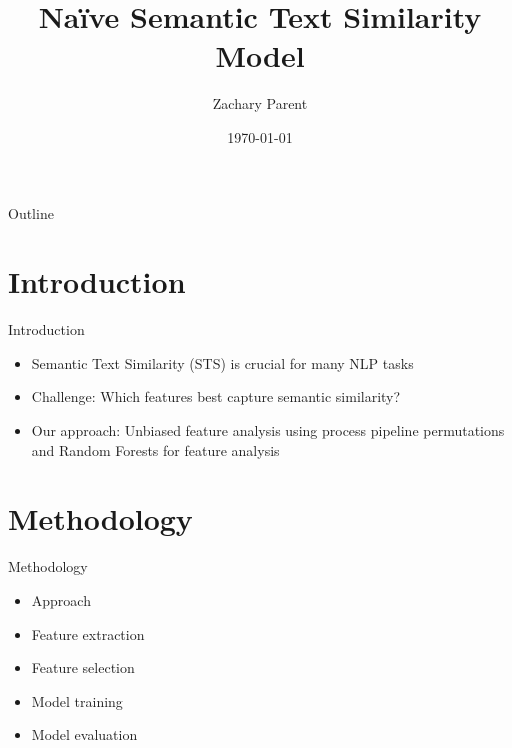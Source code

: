 \documentclass{beamer}
\title{Naïve Semantic Text Similarity Model}
\author{Zachary Parent}
\institute{UPC}
\date{\today}
\begin{document}
\begin{frame}
    \titlepage
\end{frame}

\begin{frame}{Outline}
    \tableofcontents
\end{frame}

\section{Introduction}
\begin{frame}{Introduction}
    \begin{itemize}
        \item Semantic Text Similarity (STS) is crucial for many NLP tasks
        \item Challenge: Which features best capture semantic similarity?
        \item Our approach: Unbiased feature analysis using process pipeline permutations and Random Forests for feature analysis
    \end{itemize}
\end{frame}

\section{Methodology}
\begin{frame}{Methodology}
    \begin{itemize}
        \item Approach
        \item Feature extraction
        \item Feature selection
        \item Model training
        \item Model evaluation
    \end{itemize}
\end{frame}
\end{document}
